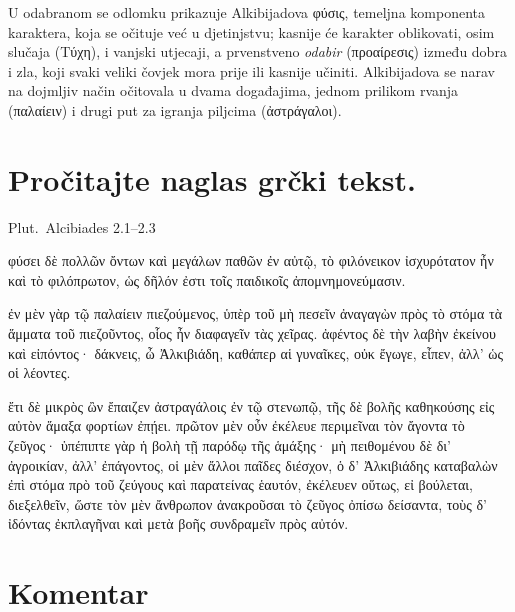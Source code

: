 U odabranom se odlomku prikazuje Alkibijadova \textgreek[variant=ancient]{φύσις,} temeljna komponenta karaktera, koja se očituje već u djetinjstvu; kasnije će karakter oblikovati, osim slučaja \textgreek[variant=ancient]{(Τύχη),} i vanjski utjecaji, a prvenstveno \textit{odabir} \textgreek[variant=ancient]{(προαίρεσις)} između dobra i zla, koji svaki veliki čovjek mora prije ili kasnije učiniti. Alkibijadova se narav na dojmljiv način očitovala u dvama događajima, jednom prilikom rvanja \textgreek[variant=ancient]{(παλαίειν)} i drugi put za igranja piljcima \textgreek[variant=ancient]{(ἀστράγαλοι).}


\section*{Pročitajte naglas grčki tekst.}

Plut.\ Alcibiades 2.1–2.3


\medskip


{\large

\begin{greek}

\noindent φύσει δὲ πολλῶν ὄντων καὶ μεγάλων παθῶν ἐν αὐτῷ, τὸ φιλόνεικον ἰσχυρότατον ἦν καὶ τὸ φιλόπρωτον, ὡς δῆλόν ἐστι τοῖς παιδικοῖς ἀπομνημονεύμασιν.

ἐν μὲν γὰρ τῷ παλαίειν πιεζούμενος, ὑπὲρ τοῦ μὴ πεσεῖν ἀναγαγὼν πρὸς τὸ στόμα τὰ ἅμματα τοῦ πιεζοῦντος, οἷος ἦν διαφαγεῖν τὰς χεῖρας. ἀφέντος δὲ τὴν λαβὴν ἐκείνου καὶ εἰπόντος· δάκνεις, ὦ Ἀλκιβιάδη, καθάπερ αἱ γυναῖκες, οὐκ ἔγωγε, εἶπεν, ἀλλ' ὡς οἱ λέοντες.

ἔτι δὲ μικρὸς ὢν ἔπαιζεν ἀστραγάλοις ἐν τῷ στενωπῷ, τῆς δὲ βολῆς καθηκούσης εἰς αὐτὸν ἅμαξα φορτίων ἐπῄει. πρῶτον μὲν οὖν ἐκέλευε περιμεῖναι τὸν ἄγοντα τὸ ζεῦγος· ὑπέπιπτε γὰρ ἡ βολὴ τῇ παρόδῳ τῆς ἁμάξης· μὴ πειθομένου δὲ δι' ἀγροικίαν, ἀλλ' ἐπάγοντος, οἱ μὲν ἄλλοι παῖδες διέσχον, ὁ δ' Ἀλκιβιάδης καταβαλὼν ἐπὶ στόμα πρὸ τοῦ ζεύγους καὶ παρατείνας ἑαυτόν, ἐκέλευεν οὕτως, εἰ βούλεται, διεξελθεῖν, ὥστε τὸν μὲν ἄνθρωπον ἀνακροῦσαι τὸ ζεῦγος ὀπίσω δείσαντα, τοὺς δ' ἰδόντας ἐκπλαγῆναι καὶ μετὰ βοῆς συνδραμεῖν πρὸς αὐτόν.

\end{greek}

}


\section*{Komentar}

